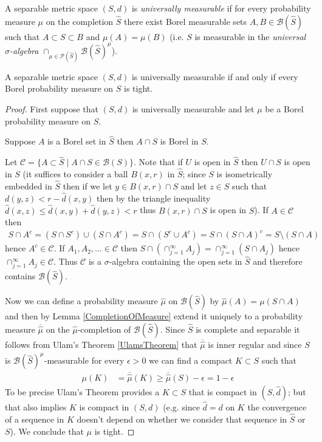 \begin{defn}A separable metric space $(S,d)$ is \emph{universally measurable} if for every probability measure $\mu$ on the completion $\hat{S}$ there exist Borel measurable sets $A, B \in \mathcal{B}(\hat{S})$ such that $A \subset S \subset B$ and $\mu(A) = \mu(B)$ (i.e. $S$ is measurable in the \emph{universal $\sigma$-algebra} $\cap_{\mu \in \mathcal{P}(\hat{S})} \mathcal{B}(\hat{S})^{\mu}$).
\end{defn}

\begin{thm}\label{UniversalMeasurabilityAndTightness}A separable metric space $(S,d)$ is universally measurable if and only if every Borel probability measure on $S$ is tight.
\end{thm}
\begin{proof}
First suppose that $(S,d)$ is universally measurable and let $\mu$ be a Borel probability measure on $S$.  
\begin{clm}Suppose $A$ is a Borel set in $\hat{S}$ then $A \cap S$ is Borel in $S$.  
\end{clm}
Let $\mathcal{C} = \lbrace A \subset \hat{S} \mid A \cap S \in \mathcal{B}(S) \rbrace$.  Note that if $U$ is open in $\hat{S}$ then $U \cap S$ is open in $S$ (it suffices to consider a ball $B(x,r)$ in $\hat{S}$; since $S$ is isometrically embedded in $\hat{S}$ then if we let $y \in B(x,r) \cap S$ and let $z \in S$ such that $d(y,z) < r - \hat{d}(x,y)$ then by the triangle inequality $\hat{d}(x,z) \leq \hat{d}(x,y) + \hat{d}(y,z) < r$ thus $B(x,r) \cap S$ is open in $S$).  
If $A \in \mathcal{C}$ then 
\begin{align*}
S \cap A^c = (S \cap S^c) \cup (S \cap A^c) = S \cap (S^c \cup A^c) = S \cap (S \cap A)^c = S \setminus (S \cap A)
\end{align*}
hence $A^c \in \mathcal{C}$.  If $A_1, A_2, \dotsc \in \mathcal{C}$  then $S \cap (\cap_{j=1}^\infty A_j) =  \cap_{j=1}^\infty (S \cap A_j)$ hence $\cap_{j=1}^\infty A_j \in \mathcal{C}$. Thus $\mathcal{C}$ is a $\sigma$-algebra containing the open sets in $\hat{S}$ and therefore contains $\mathcal{B}(\hat{S})$.  

Now we can define a probability measure $\hat{\mu}$ on $\mathcal{B}(\hat{S})$ by $\hat{\mu}(A) = \mu(S \cap A)$ and then by Lemma \ref{CompletionOfMeasure} extend it uniquely to a probability measure $\overline{\hat{\mu}}$ on the $\hat{\mu}$-completion of $\mathcal{B}(\hat{S})$.  Since $\hat{S}$ is complete and separable it follows from Ulam's Theorem \ref{UlamsTheorem} that $\overline{\hat{\mu}}$ is inner regular and since $S$ is 
$\mathcal{B}(\hat{S})^{\hat{\mu}}$-measurable for every $\epsilon>0$ we can find a compact $K \subset S$ such that 
\begin{align*}
\mu(K) &= \overline{\hat{\mu}}(K) \geq  \overline{\hat{\mu}}(S) - \epsilon = 1 - \epsilon
\end{align*}
To be precise Ulam's Theorem provides a $K \subset S$ that is compact in $(\hat{S}, \hat{d})$; but that also implies $K$ is compact in $(S,d)$ (e.g. since $\hat{d} = d$ on $K$ the convergence of a sequence in $K$ doesn't depend on whether we consider that sequence in $\hat{S}$ or $S$).  We conclude that $\mu$ is tight.


\end{proof}
